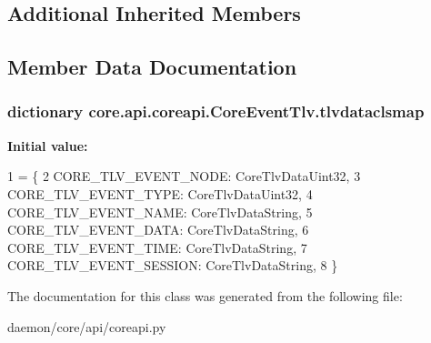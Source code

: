 \subsection*{Additional Inherited Members}


\subsection{Member Data Documentation}
\hypertarget{classcore_1_1api_1_1coreapi_1_1_core_event_tlv_aa6a5d6a8f6a624a85b1570698b85a407}{
\subsubsection[{tlvdataclsmap}]{\setlength{\rightskip}{0pt plus 5cm}dictionary core.\+api.\+coreapi.\+Core\+Event\+Tlv.\+tlvdataclsmap\hspace{0.3cm}{\ttfamily [static]}}}\label{classcore_1_1api_1_1coreapi_1_1_core_event_tlv_aa6a5d6a8f6a624a85b1570698b85a407}
{\bfseries Initial value\+:}
\begin{DoxyCode}
1 = \{
2         CORE\_TLV\_EVENT\_NODE: CoreTlvDataUint32,
3         CORE\_TLV\_EVENT\_TYPE: CoreTlvDataUint32,
4         CORE\_TLV\_EVENT\_NAME: CoreTlvDataString,
5         CORE\_TLV\_EVENT\_DATA: CoreTlvDataString,
6         CORE\_TLV\_EVENT\_TIME: CoreTlvDataString,
7         CORE\_TLV\_EVENT\_SESSION: CoreTlvDataString,
8     \}
\end{DoxyCode}


The documentation for this class was generated from the following file\+:\begin{DoxyCompactItemize}
\item 
daemon/core/api/coreapi.\+py\end{DoxyCompactItemize}
